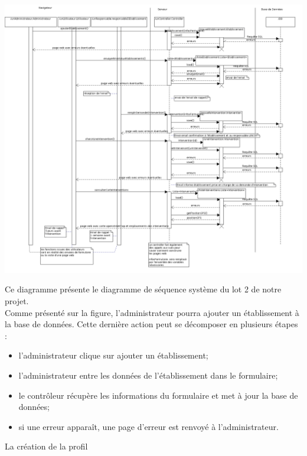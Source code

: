 \includegraphics[scale=0.34]{images/diagrammeSequenceSysteme/diagrammeSequence.png}

Ce diagramme présente le diagramme de séquence système du lot 2 de notre projet. \\
Comme présenté sur la figure, l'administrateur pourra ajouter un établissement à la base de données. Cette dernière action peut se décomposer en plusieurs étapes : 
\begin{itemize}
	\item l'administrateur clique sur ajouter un établissement;
	\item l'administrateur entre les données de l'établissement dans le formulaire;
	\item le contrôleur récupère les informations du formulaire et met à jour la base de données;
	\item si une erreur apparaît, une page d'erreur est renvoyé à l'administrateur.
\end{itemize}


La création de la profil 